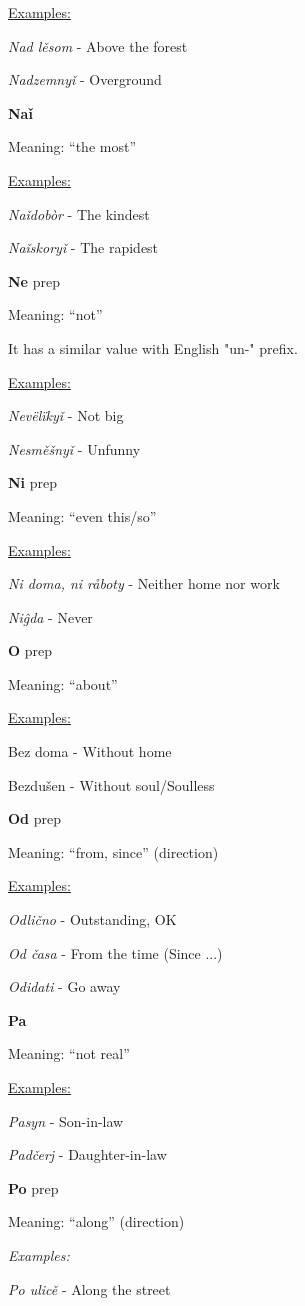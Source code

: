 \underline{Examples:}

\textit{Nad lěsom} - Above the forest

\textit{Nadzemnyǐ} - Overground

\textbf{Naǐ}

Meaning: “the most”

\underline{Examples:}

\textit{Naǐdobòr} - The kindest

\textit{Naǐskoryǐ} - The rapidest

\textbf{Ne} \gls{prep}

Meaning: “not”

It has a similar value with English "un-" prefix.

\underline{Examples:}

\textit{Nevëlïkyǐ} - Not big

\textit{Nesměšnyǐ} - Unfunny

\textbf{Ni} \gls{prep}

Meaning: “even this/so”

\underline{Examples:}

\textit{Ni doma, ni råboty} - Neither home nor work 

\textit{Niĝda} - Never

\textbf{O}  \gls{prep}

Meaning: “about”

\underline{Examples:}

Bez doma - Without home

Bezdušen - Without soul/Soulless 

\textbf{Od} \gls{prep}

Meaning: “from, since” (direction)

\underline{Examples:}

\textit{Odlično} - Outstanding, OK

\textit{Od časa} - From the time (Since ...)

\textit{Odidati} - Go away

\textbf{Pa}

Meaning: “not real”

\underline{Examples:}

\textit{Pasyn} - Son-in-law

\textit{Padčerj} - Daughter-in-law

\textbf{Po} \gls{prep}

Meaning: “along” (direction)

\textit{Examples:}

\textit{Po ulicě} - Along the street

